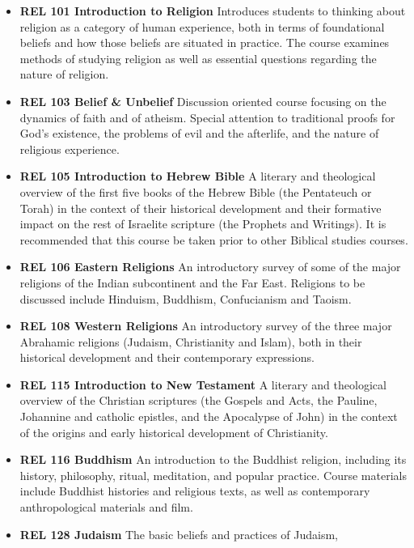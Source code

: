 \documentclass[
  letterpaper,
]{scrbook}
\providecommand{\tightlist}{%
  \setlength{\itemsep}{0pt}\setlength{\parskip}{0pt}}
\begin{document}
\begin{itemize}
\tightlist
\item
  \textbf{REL 101 Introduction to Religion} Introduces students to
  thinking about religion as a category of human experience, both in
  terms of foundational beliefs and how those beliefs are situated in
  practice. The course examines methods of studying religion as well as
  essential questions regarding the nature of religion.\\
\item
  \textbf{REL 103 Belief \& Unbelief} Discussion oriented course
  focusing on the dynamics of faith and of atheism. Special attention to
  traditional proofs for God's existence, the problems of evil and the
  afterlife, and the nature of religious experience.
\item
  \textbf{REL 105 Introduction to Hebrew Bible} A literary and
  theological overview of the first five books of the Hebrew Bible (the
  Pentateuch or Torah) in the context of their historical development
  and their formative impact on the rest of Israelite scripture (the
  Prophets and Writings). It is recommended that this course be taken
  prior to other Biblical studies courses.\\
\item
  \textbf{REL 106 Eastern Religions} An introductory survey of some of
  the major religions of the Indian subcontinent and the Far East.
  Religions to be discussed include Hinduism, Buddhism, Confucianism and
  Taoism.
\item
  \textbf{REL 108 Western Religions} An introductory survey of the three
  major Abrahamic religions (Judaism, Christianity and Islam), both in
  their historical development and their contemporary expressions.\\
\item
  \textbf{REL 115 Introduction to New Testament} A literary and
  theological overview of the Christian scriptures (the Gospels and
  Acts, the Pauline, Johannine and catholic epistles, and the Apocalypse
  of John) in the context of the origins and early historical
  development of Christianity.
\item
  \textbf{REL 116 Buddhism} An introduction to the Buddhist religion,
  including its history, philosophy, ritual, meditation, and popular
  practice. Course materials include Buddhist histories and religious
  texts, as well as contemporary anthropological materials and film.
\item
  \textbf{REL 128 Judaism} The basic beliefs and practices of Judaism,

\end{itemize}
\end{document}
